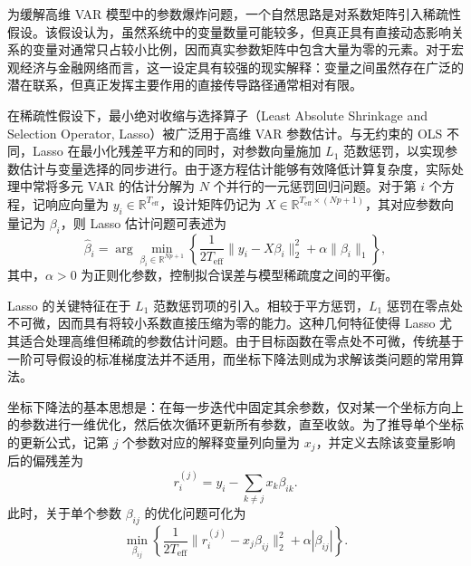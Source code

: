 \documentclass[UTF8,a4paper,12pt]{ctexbook}
\begin{document}
为缓解高维 VAR 模型中的参数爆炸问题，一个自然思路是对系数矩阵引入稀疏性假设。该假设认为，虽然系统中的变量数量可能较多，但真正具有直接动态影响关系的变量对通常只占较小比例，因而真实参数矩阵中包含大量为零的元素。对于宏观经济与金融网络而言，这一设定具有较强的现实解释：变量之间虽然存在广泛的潜在联系，但真正发挥主要作用的直接传导路径通常相对有限。

在稀疏性假设下，最小绝对收缩与选择算子（Least Absolute Shrinkage and Selection Operator, Lasso）被广泛用于高维 VAR 参数估计。与无约束的 OLS 不同，Lasso 在最小化残差平方和的同时，对参数向量施加 $L_1$ 范数惩罚，以实现参数估计与变量选择的同步进行。由于逐方程估计能够有效降低计算复杂度，实际处理中常将多元 VAR 的估计分解为 $N$ 个并行的一元惩罚回归问题。对于第 $i$ 个方程，记响应向量为 $y_i\in\mathbb{R}^{T_{\mathrm{eff}}}$，设计矩阵仍记为 $X\in\mathbb{R}^{T_{\mathrm{eff}}\times(Np+1)}$，其对应参数向量记为 $\beta_i$，则 Lasso 估计问题可表述为
\begin{equation}
 \hat{\beta}_i=\arg\min_{\beta_i\in\mathbb{R}^{Np+1}}
 \left\{
 \frac{1}{2T_{\mathrm{eff}}}\lVert y_i-X\beta_i\rVert_2^2 + \alpha\lVert\beta_i\rVert_1
 \right\},
\end{equation}
其中，$\alpha>0$ 为正则化参数，控制拟合误差与模型稀疏度之间的平衡。

Lasso 的关键特征在于 $L_1$ 范数惩罚项的引入。相较于平方惩罚，$L_1$ 惩罚在零点处不可微，因而具有将较小系数直接压缩为零的能力。这种几何特征使得 Lasso 尤其适合处理高维但稀疏的参数估计问题。由于目标函数在零点处不可微，传统基于一阶可导假设的标准梯度法并不适用，而坐标下降法则成为求解该类问题的常用算法。

坐标下降法的基本思想是：在每一步迭代中固定其余参数，仅对某一个坐标方向上的参数进行一维优化，然后依次循环更新所有参数，直至收敛。为了推导单个坐标的更新公式，记第 $j$ 个参数对应的解释变量列向量为 $x_j$，并定义去除该变量影响后的偏残差为
\begin{equation}
 r_i^{(j)}=y_i-\sum_{k\neq j}x_k\beta_{ik}.
\end{equation}
此时，关于单个参数 $\beta_{ij}$ 的优化问题可化为
\begin{equation}
 \min_{\beta_{ij}}
 \left\{
 \frac{1}{2T_{\mathrm{eff}}}\lVert r_i^{(j)}-x_j\beta_{ij}\rVert_2^2 + \alpha|\beta_{ij}|
 \right\}.
\end{equation}
\end{document}
